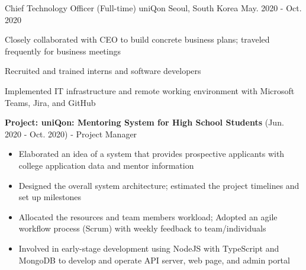 \begin{cventries}
  \cventry
  {Chief Technology Officer (Full-time)} %
  {uniQon} %
  {Seoul, South Korea} %
  {May. 2020 - Oct. 2020} %
  {
    \begin{cvitems} %
      \item {Closely collaborated with CEO to build concrete business plans; traveled frequently for business meetings}
      \item {Recruited and trained interns and software developers}
      \item {Implemented IT infrastructure and remote working environment with Microsoft Teams, Jira, and GitHub}
      \item {\textbf{Project: uniQon: Mentoring System for High School Students} (Jun. 2020 - Oct. 2020) - Project Manager}
      \begin{itemize}[leftmargin=0pt, label={}]
        \item {Elaborated an idea of a system that provides prospective applicants with college application data and mentor information}
        \item {Designed the overall system architecture; estimated the project timelines and set up milestones}
        \item {Allocated the resources and team members workload; Adopted an agile workflow process (Scrum) with weekly feedback to team/individuals}
        \item {Involved in early-stage development using NodeJS with TypeScript and MongoDB to develop and operate API server, web page, and admin portal}
      \end{itemize}
    \end{cvitems}
  }


\end{cventries}

